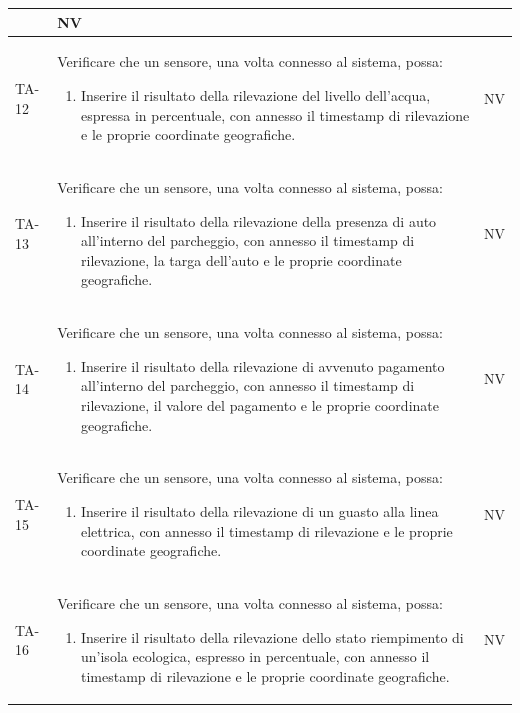 \documentclass[8pt]{article}
\begin{document}
\begin{longtable}{|>{\centering}p{2cm}|>{\RaggedRight}m{12cm}|>{\centering\arraybackslash}p{2cm}|}
\begin{enumerate}
    \end{enumerate}
    & NV \\
    \hline
    TA-12 &
    Verificare che un sensore, una volta connesso al sistema, possa:
    \begin{enumerate}
    \item Inserire il risultato della rilevazione del livello dell'acqua, espressa in percentuale, con annesso il timestamp di rilevazione e le proprie coordinate geografiche.
    \end{enumerate}
    & NV \\
    \hline
    TA-13 &
    Verificare che un sensore, una volta connesso al sistema, possa:
    \begin{enumerate}
    \item  Inserire il risultato della rilevazione della presenza di auto all’interno del
        parcheggio, con annesso il timestamp di rilevazione, la targa dell'auto e le proprie coordinate geografiche. 
    \end{enumerate}
    & NV \\
    \hline
    TA-14 &
    Verificare che un sensore, una volta connesso al sistema, possa:
    \begin{enumerate}
    \item Inserire il risultato della rilevazione di avvenuto pagamento all’interno del
        parcheggio, con annesso il timestamp di rilevazione, il valore del pagamento e le proprie coordinate geografiche. 
    \end{enumerate}
    & NV \\
    \hline
    TA-15 &
    Verificare che un sensore, una volta connesso al sistema, possa:
    \begin{enumerate}
    \item Inserire il risultato della rilevazione di un guasto alla linea elettrica, con annesso il timestamp di rilevazione e le proprie coordinate geografiche. 
    \end{enumerate}
    & NV \\
    \hline
    TA-16 &
    Verificare che un sensore, una volta connesso al sistema, possa:
    \begin{enumerate}
    \item Inserire il risultato della rilevazione dello stato riempimento di un'isola ecologica, espresso in percentuale, con annesso il timestamp di rilevazione e le proprie coordinate geografiche. 
    \end{enumerate}
    & NV \\

\end{longtable}
\end{document}
